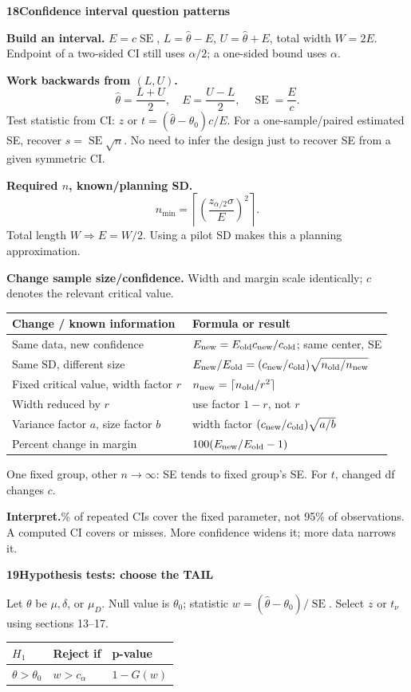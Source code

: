 \documentclass[a4paper,landscape]{article}
\newcommand{\head}[2][late]{\par\vspace{3pt}\noindent\colorbox{#1}{\parbox{\dimexpr\linewidth-6pt}{\color{white}\bfseries #2}}\par\vspace{1pt}}
\newcommand{\cue}[1]{\par\textbf{#1}\enspace}
\newcommand{\SE}{\operatorname{SE}}
\newcommand{\col}{\par\vfill\columnbreak}
\newcommand{\tblhead}[1]{\textbf{#1}}
\begin{document}
\begin{multicols*}{4}
\head{18\quad Confidence interval question patterns}
\cue{Build an interval.} \(E=c\SE\), \(L=\hat\theta-E\), \(U=\hat\theta+E\), total width \(W=2E\). Endpoint of a two-sided CI still uses \(\alpha/2\); a one-sided bound uses \(\alpha\).
\cue{Work backwards from \((L,U)\).}
\[\hat\theta=\frac{L+U}{2},\quad E=\frac{U-L}{2},\quad
 \SE=\frac{E}{c}.\]
Test statistic from CI: \(z\text{ or }t=(\hat\theta-\theta_0)c/E\). For a one-sample/paired estimated SE, recover \(s=\SE\sqrt n\). No need to infer the design just to recover SE from a given symmetric CI.
\cue{Required \(n\), known/planning SD.}
\[n_{\min}=\left\lceil\left(\frac{z_{\alpha/2}\sigma}{E}\right)^2\right\rceil.\]
Total length \(W\Rightarrow E=W/2\). Using a pilot SD makes this a planning approximation.
\cue{Change sample size/confidence.} Width and margin scale identically; \(c\) denotes the relevant critical value.
\begin{tabular}{@{}L{.44\linewidth}L{.50\linewidth}@{}}
\tblhead{Change / known information} & \tblhead{Formula or result}\\\hline
Same data, new confidence & \(E_{\rm new}=E_{\rm old}c_{\rm new}/c_{\rm old}\); same center, SE\\
Same SD, different size & \(E_{\rm new}/E_{\rm old}=(c_{\rm new}/c_{\rm old})\sqrt{n_{\rm old}/n_{\rm new}}\)\\
Fixed critical value, width factor \(r\) & \(n_{\rm new}=\lceil n_{\rm old}/r^2\rceil\)\\
Width reduced by \(r\) & use factor \(1-r\), not \(r\)\\
Variance factor \(a\), size factor \(b\) & width factor \((c_{\rm new}/c_{\rm old})\sqrt{a/b}\)\\
Percent change in margin & \(100(E_{\rm new}/E_{\rm old}-1)\)
\end{tabular}
One fixed group, other \(n\to\infty\): SE tends to fixed group's SE. For \(t\), changed df changes \(c\).
\cue{Interpret.} 95\% of repeated CIs cover the fixed parameter, not 95\% of observations. A computed CI covers or misses. More confidence widens it; more data narrows it.
\col
\head{19\quad Hypothesis tests: choose the TAIL}
Let \(\theta\) be \(\mu,\delta\), or \(\mu_D\). Null value is \(\theta_0\); statistic \(w=(\hat\theta-\theta_0)/\SE\). Select \(z\) or \(t_\nu\) using sections 13--17.
\begin{tabular}{@{}L{.25\linewidth}L{.33\linewidth}L{.32\linewidth}@{}}
\tblhead{\(H_1\)} & \tblhead{Reject if} & \tblhead{p-value}\\\hline
\(\theta>\theta_0\) & \(w>c_\alpha\) & \(1-G(w)\)\\

\end{tabular}
\end{multicols*}
\end{document}
